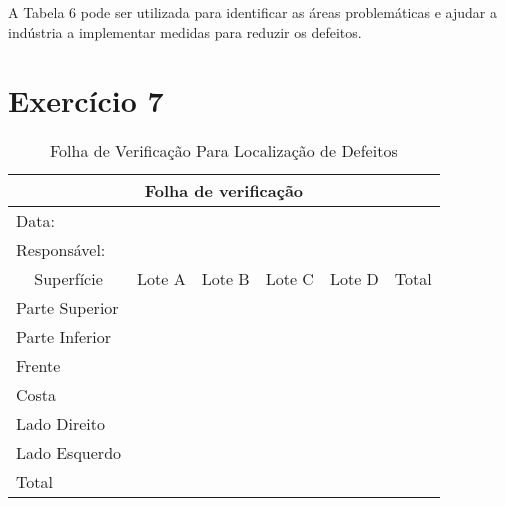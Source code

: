 \documentclass{article}
\begin{document}
 A Tabela 6  pode ser utilizada para identificar as áreas problemáticas e ajudar a indústria a implementar medidas para reduzir os defeitos.

\section*{Exercício 7}

\begin{table}[h!]
\centering
\caption{ Folha de Verificação Para Localização de Defeitos}
\begin{tabular}{|llllll|}
\hline
\multicolumn{6}{|c|}{Folha de verificação}                                                                                                                                                \\ \hline
\multicolumn{6}{|l|}{Data:}                                                                                                                                                               \\ \hline
\multicolumn{6}{|l|}{Responsável:}                                                                                                                                                        \\ \hline
\multicolumn{1}{|c|}{Superfície}     & \multicolumn{1}{c|}{Lote A} & \multicolumn{1}{c|}{Lote B} & \multicolumn{1}{c|}{Lote C} & \multicolumn{1}{l|}{Lote D} & \multicolumn{1}{c|}{Total} \\ \hline
\multicolumn{1}{|l|}{Parte Superior} & \multicolumn{1}{l|}{}       & \multicolumn{1}{l|}{}       & \multicolumn{1}{c|}{}       & \multicolumn{1}{c|}{}       &                            \\ \hline
\multicolumn{1}{|l|}{Parte Inferior} & \multicolumn{1}{l|}{}       & \multicolumn{1}{l|}{}       & \multicolumn{1}{l|}{}       & \multicolumn{1}{l|}{}       &                            \\ \hline
\multicolumn{1}{|l|}{Frente}         & \multicolumn{1}{l|}{}       & \multicolumn{1}{l|}{}       & \multicolumn{1}{l|}{}       & \multicolumn{1}{l|}{}       &                            \\ \hline
\multicolumn{1}{|l|}{Costa}          & \multicolumn{1}{l|}{}       & \multicolumn{1}{l|}{}       & \multicolumn{1}{l|}{}       & \multicolumn{1}{l|}{}       &                            \\ \hline
\multicolumn{1}{|l|}{Lado Direito}   & \multicolumn{1}{l|}{}       & \multicolumn{1}{l|}{}       & \multicolumn{1}{l|}{}       & \multicolumn{1}{l|}{}       &                            \\ \hline
\multicolumn{1}{|l|}{Lado Esquerdo}  & \multicolumn{1}{l|}{}       & \multicolumn{1}{l|}{}       & \multicolumn{1}{l|}{}       & \multicolumn{1}{l|}{}       &                            \\ \hline
\multicolumn{1}{|l|}{Total}          & \multicolumn{1}{l|}{}       & \multicolumn{1}{l|}{}       & \multicolumn{1}{l|}{}       & \multicolumn{1}{l|}{}       &                            \\ \hline
\end{tabular}
\end{table}
\end{document}
